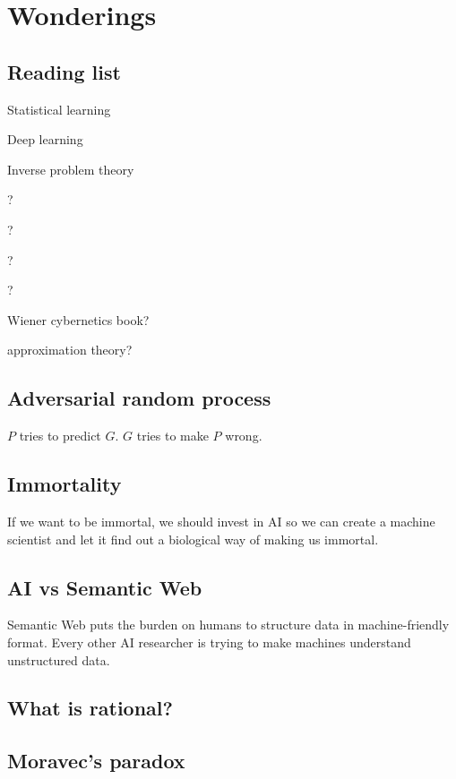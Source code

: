 \chapter{Wonderings}

\section{Reading list}

Statistical learning

Deep learning \cite{DeepLearning}

Inverse problem theory \cite{tarantola2005inverse}

? \cite{DeepArch}

? \cite{RepLearn}

? \cite{SuttonBartoRein}

? \cite{SepLogicAi}

Wiener cybernetics book? \cite{WienerCyber}

approximation theory? \cite{ApproxThePrac}

\section{Adversarial random process}

\(P\) tries to predict \(G\).
\(G\) tries to make \(P\) wrong.

\section{Immortality}

If we want to be immortal,
we should invest in AI so we can create a machine scientist
and let it find out a biological way of making us immortal.

\section{AI vs Semantic Web}

Semantic Web puts the burden on humans to structure data in machine-friendly format.
Every other AI researcher is trying to make machines understand unstructured data.

\section{What is rational?}

\section{Moravec's paradox}

